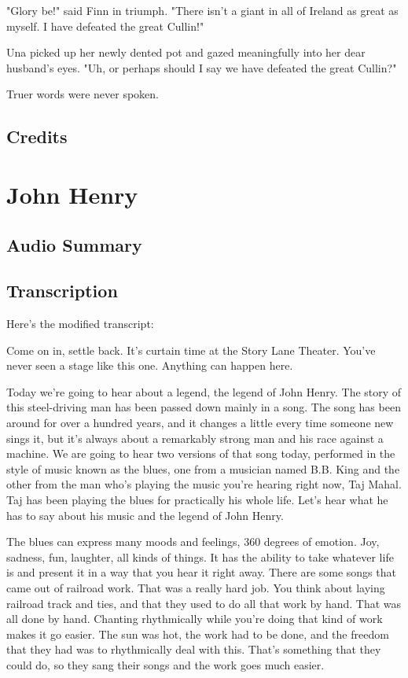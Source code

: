 "Glory be!" said Finn in triumph. "There isn't a giant in all of Ireland as great as myself. I have defeated the great Cullin!"

Una picked up her newly dented pot and gazed meaningfully into her dear husband's eyes. "Uh, or perhaps should I say we have defeated the great Cullin?"

Truer words were never spoken.

\subsection{Credits}

\section{John Henry}

\subsection{Audio Summary}

\subsection{Transcription}

Here's the modified transcript:

Come on in, settle back. It's curtain time at the Story Lane Theater. You've never seen a stage like this one. Anything can happen here.

Today we're going to hear about a legend, the legend of John Henry. The story of this steel-driving man has been passed down mainly in a song. The song has been around for over a hundred years, and it changes a little every time someone new sings it, but it's always about a remarkably strong man and his race against a machine. We are going to hear two versions of that song today, performed in the style of music known as the blues, one from a musician named B.B. King and the other from the man who's playing the music you're hearing right now, Taj Mahal. Taj has been playing the blues for practically his whole life. Let's hear what he has to say about his music and the legend of John Henry.

The blues can express many moods and feelings, 360 degrees of emotion. Joy, sadness, fun, laughter, all kinds of things. It has the ability to take whatever life is and present it in a way that you hear it right away. There are some songs that came out of railroad work. That was a really hard job. You think about laying railroad track and ties, and that they used to do all that work by hand. That was all done by hand. Chanting rhythmically while you're doing that kind of work makes it go easier. The sun was hot, the work had to be done, and the freedom that they had was to rhythmically deal with this. That's something that they could do, so they sang their songs and the work goes much easier.

